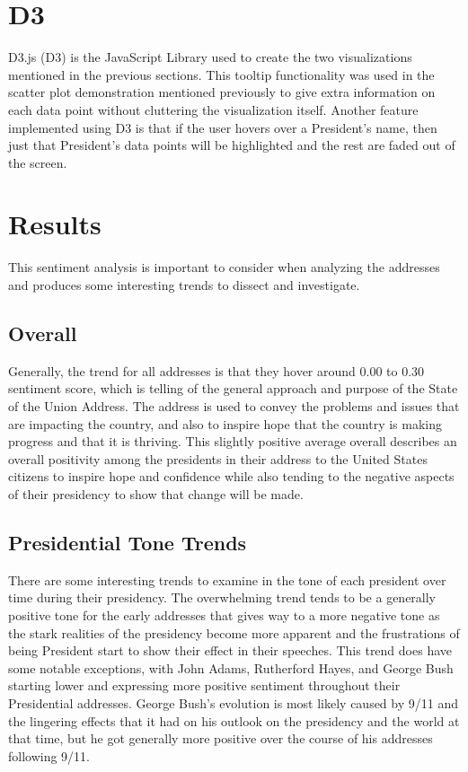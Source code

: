 \section{D3}
D3.js (D3) is the JavaScript Library used to create the two visualizations mentioned in the previous sections.
This tooltip functionality was used in the scatter plot demonstration mentioned previously to give extra information on each data point without cluttering the visualization itself.
Another feature implemented using D3 is that if the user hovers over a President's name, then just that President's data points will be highlighted and the rest are faded out of the screen.

\section{Results}
This sentiment analysis is important to consider when analyzing the addresses and produces some interesting trends to dissect and investigate.

\subsection{Overall}
Generally, the trend for all addresses is that they hover around 0.00 to 0.30 sentiment score, which is telling of the general approach and purpose of the State of the Union Address.
The address is used to convey the problems and issues that are impacting the country, and also to inspire hope that the country is making progress and that it is thriving.
This slightly positive average overall describes an overall positivity among the presidents in their address to the United States citizens to inspire hope and confidence while also tending to the negative aspects of their presidency to show that change will be made.

\subsection{Presidential Tone Trends}
There are some interesting trends to examine in the tone of each president over time during their presidency.
The overwhelming trend tends to be a generally positive tone for the early addresses that gives way to a more negative tone as the stark realities of the presidency become more apparent and the frustrations of being President start to show their effect in their speeches.
This trend does have some notable exceptions, with John Adams, Rutherford Hayes, and George Bush starting lower and expressing more positive sentiment throughout their Presidential addresses.
George Bush's evolution is most likely caused by 9/11 and the lingering effects that it had on his outlook on the presidency and the world at that time, but he got generally more positive over the course of his addresses following 9/11.

